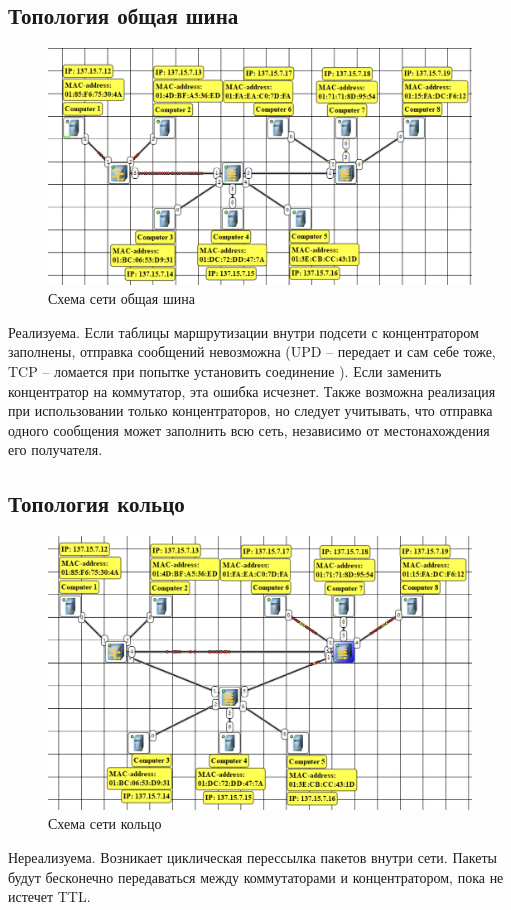 \documentclass[12pt,onecolumn]{article}
\begin{document}
\subsection{Топология общая шина}
\begin{figure}[H]
  \centering
  \includegraphics[width=\textwidth]{image/part3/shared-bus.png}
  \caption{Схема сети общая шина}
\end{figure}
Реализуема. Если таблицы маршрутизации внутри подсети с концентратором заполнены, отправка сообщений невозможна (UPD -- передает и сам себе тоже, TCP -- ломается при попытке установить соединение ). Если заменить концентратор на коммутатор, эта ошибка исчезнет. Также возможна реализация при использовании только концентраторов, но следует учитывать, что отправка одного сообщения может заполнить всю сеть, независимо от местонахождения его получателя.
\subsection{Топология кольцо}
\begin{figure}[H]
  \centering
  \includegraphics[width=\textwidth]{image/part3/ring.png}
  \caption{Схема сети кольцо}
\end{figure}
Нереализуема. Возникает циклическая перессылка пакетов внутри сети. Пакеты будут бесконечно передаваться между коммутаторами и концентратором, пока не истечет TTL. 
\end{document}
